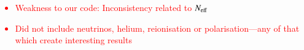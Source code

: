 


\textcolor{red}{
\begin{itemize}
    \item Weakness to our code: Inconsistency related to $N_\mathrm{eff}$
    \item Did not include neutrinos, helium, reionisation or polarisation---any of that which create interesting results
\end{itemize}
}